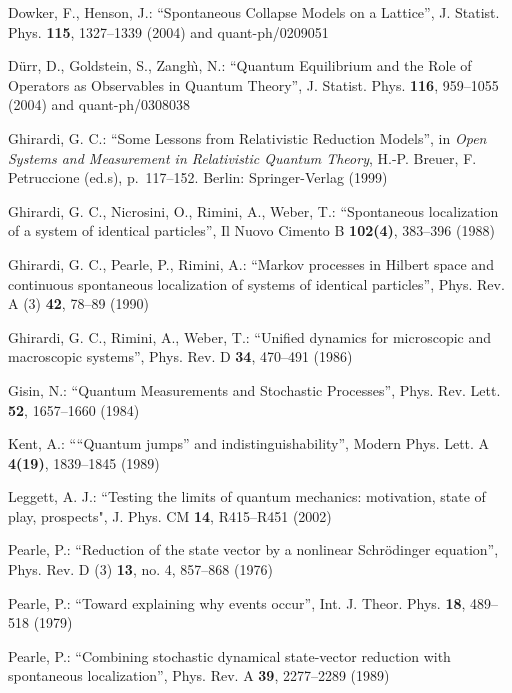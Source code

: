 \documentclass[12pt]{article}
\newcommand{\1}{1}
\begin{document}
\begin{thebibliography}{[20]}
 Dowker, F., Henson, J.: ``Spontaneous Collapse
  Models on a Lattice'', J. Statist. Phys. \textbf{115}, 1327--1339
  (2004) and quant-ph/0209051

 D\"urr, D., Goldstein, S., Zangh\`\i, N.: ``Quantum
  Equilibrium and the Role of Operators as Observables in Quantum 
  Theory'', J. Statist. Phys. \textbf{116}, 959--1055 (2004) and 
  quant-ph/0308038

 Ghirardi, G. C.: ``Some Lessons from Relativistic
   Reduction Models'', in \textit{Open Systems and 
   Measurement in Relativistic Quantum Theory}, 
   H.-P. Breuer, F. Petruccione (ed.s), p.~117--152.
   Berlin: Springer-Verlag (1999)

 Ghirardi, G. C., Nicrosini, O., Rimini, A., Weber, T.:
   ``Spontaneous localization of a system of identical particles'',  
   Il Nuovo Cimento B \textbf{102(4)}, 383--396 (1988)

 Ghirardi, G. C., Pearle, P., Rimini, A.: ``Markov 
  processes in Hilbert space and continuous spontaneous localization 
  of systems of identical particles'',  Phys. Rev. A (3) \textbf{42}, 78--89 (1990)
  
 Ghirardi, G. C., Rimini, A., Weber, T.: ``Unified
  dynamics for microscopic and macroscopic systems'', Phys. Rev. D
  \textbf{34}, 470--491 (1986)

 Gisin, N.: ``Quantum Measurements and Stochastic Processes'',
   Phys. Rev. Lett. \textbf{52}, 1657--1660 (1984)


 Kent, A.: ````Quantum jumps'' and indistinguishability'',
  Modern Phys. Lett. A \textbf{4(19)}, 1839--1845 (1989)

 Leggett, A. J.: ``Testing the limits of quantum
   mechanics: motivation, state of play, prospects", 
   J. Phys. CM \textbf{14}, R415--R451 (2002)

  Pearle, P.: ``Reduction of the state vector by a 
   nonlinear Schr\"odinger equation'', Phys. Rev. D (3)  \textbf{13}, 
   no. 4, 857--868 (1976)

 Pearle, P.: ``Toward explaining why events occur'', 
   Int. J. Theor. Phys. \textbf{18}, 489--518 (1979)

 Pearle, P.: ``Combining stochastic dynamical state-vector 
   reduction with spontaneous localization'', Phys. Rev. A \textbf{39}, 
   2277--2289 (1989)


\end{thebibliography}
\end{document}
